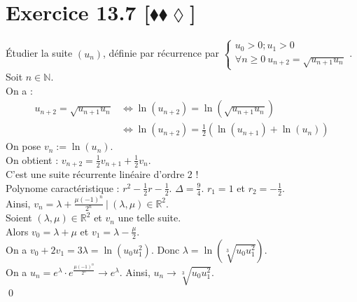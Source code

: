 \documentclass[10pt]{article}
\begin{document}
\section*{Exercice 13.7 [$\blacklozenge\blacklozenge\lozenge$]}
\begin{tcolorbox}[enhanced, width=7.6in, center, size=fbox, fontupper=\large, drop shadow southwest]
    Étudier la suite $(u_n)$, définie par récurrence par $\begin{cases}
        u_0 > 0; u_1 > 0\\
        \forall n \geq 0 ~ u_{n+2} = \sqrt{u_{n+1}u_n}
    \end{cases}$.\\
    Soit $n\in\mathbb{N}$.\\
    On a :
    \begin{align*}
        u_{n+2} = \sqrt{u_{n+1}u_n} &\iff \ln(u_{n+2}) = \ln(\sqrt{u_{n+1}u_n})\\
        &\iff \ln(u_{n+2}) = \frac{1}{2}(\ln(u_{n+1}) + \ln(u_n))
    \end{align*}
    On pose $v_n := \ln(u_n)$.\\
    On obtient : $v_{n+2} = \frac{1}{2}v_{n+1} + \frac{1}{2}v_n$.\\
    C'est une suite récurrente linéaire d'ordre 2 !\\
    Polynome caractéristique : $r^2 - \frac{1}{2}r - \frac{1}{2}$. $\Delta = \frac{9}{4}$. $r_1 = 1$ et $r_2 = -\frac{1}{2}$.\\
    Ainsi, $v_n = \lambda + \frac{\mu(-1)^n}{2^n} ~ | ~ (\lambda, \mu)\in\mathbb{R}^2$.\\
    Soient $(\lambda,\mu)\in\mathbb{R}^2$ et $v_n$ une telle suite.\\
    Alors $v_0 = \lambda + \mu$ et $v_1 = \lambda - \frac{\mu}{2}$.\\
    On a $v_0 + 2v_1 = 3\lambda = \ln(u_0u_1^2)$. Donc $\lambda = \ln(\sqrt[3]{u_0u_1^2})$.\\
    On a $u_n = e^\lambda \cdot e^{\frac{\mu(-1)^n}{2^n}} \to e^{\lambda}$. Ainsi, $u_n \to \sqrt[3]{u_0u_1^2}$.\\
    \qed
\end{tcolorbox}

\end{document}
